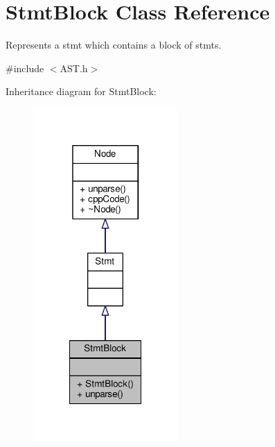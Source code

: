 \hypertarget{classStmtBlock}{\section{Stmt\-Block Class Reference}
\label{classStmtBlock}
}


Represents a stmt which contains a block of stmts. \par
  




{\ttfamily \#include $<$A\-S\-T.\-h$>$}



Inheritance diagram for Stmt\-Block\-:\nopagebreak
\begin{figure}[H]
\begin{center}
\leavevmode
\includegraphics[width=156pt]{classStmtBlock__inherit__graph}
\end{center}
\end{figure}


